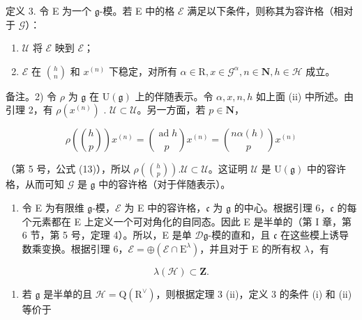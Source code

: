 定义 3. 令 E 为一个 \(\mathfrak{g}\)-模。若 E 中的格 \(\mathcal{E}\) 满足以下条件，则称其为容许格（相对于 \(\mathcal{G}\)）：

\begin{enumerate}
\def\labelenumi{(\roman{enumi})}
\item
  \(\mathcal{U}\) 将 \(\mathcal{E}\) 映到 \(\mathcal{E}\)；
\item
  \(\mathcal{E}\) 在 \(\binom{h}{n}\) 和 \(x^{(n)}\) 下稳定，对所有 \(\alpha \in \mathrm{R}, x \in \mathcal{G}^{\alpha}, n \in \mathbf{N}, h \in \mathcal{H}\) 成立。
\end{enumerate}

备注。2) 令 \(\rho\) 为 \(\mathfrak{g}\) 在 \(\mathrm{U}(\mathfrak{g})\) 上的伴随表示。令 \(\alpha, x, n, h\) 如上面 (ii) 中所述。由引理 2，有 \(\rho(x^{(n)})\) . \(\mathcal{U} \subset \mathcal{U}\)。另一方面，若 \(p \in \mathbf{N}\)，

\[
\rho \left(\binom{h}{p}\right) x ^ {(n)} = \binom{\operatorname{ad} h}{p} x ^ {(n)} = \binom{n \alpha (h)}{p} x ^ {(n)}
\]

（第 5 号，公式 (13)），所以 \(\rho\left(\binom{h}{p}\right). \mathcal{U} \subset \mathcal{U}\)。这证明 \(\mathcal{U}\) 是 \(\mathrm{U}(\mathfrak{g})\) 中的容许格，从而可知 \(\mathcal{G}\) 是 \(\mathfrak{g}\) 中的容许格（对于伴随表示）。

\begin{enumerate}
\def\labelenumi{\arabic{enumi})}
\setcounter{enumi}{2}
\tightlist
\item
  令 E 为有限维 \(\mathfrak{g}\)-模，\(\mathcal{E}\) 为 E 中的容许格，\(\mathfrak{c}\) 为 \(\mathfrak{g}\) 的中心。根据引理 6，\(\mathfrak{c}\) 的每个元素都在 E 上定义一个可对角化的自同态。因此 E 是半单的（第 I 章，第 6 节，第 5 号，定理 4）。所以，E 是单 \(\mathcal{D}\mathfrak{g}\)-模的直和，且 \(\mathfrak{c}\) 在这些模上诱导数乘变换。根据引理 6，\(\mathcal{E}=\oplus(\mathcal{E}\cap\mathrm{E}^{\lambda})\)，并且对于 E 的所有权 \(\lambda\)，有
\end{enumerate}

\[
\lambda (\mathcal {H}) \subset \mathbf {Z}.
\]

\begin{enumerate}
\def\labelenumi{\arabic{enumi})}
\setcounter{enumi}{3}
\tightlist
\item
  若 \(\mathfrak{g}\) 是半单的且 \(\mathcal{H} = \mathrm{Q}(\mathrm{R}^{\vee})\)，则根据定理 3 (ii)，定义 3 的条件 (i) 和 (ii) 等价于
\end{enumerate}

